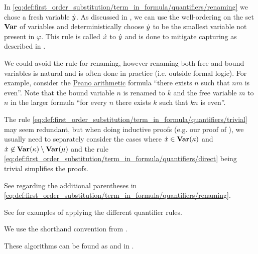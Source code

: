 \begin{comments}
  \item In \eqref{eq:def:first_order_substitution/term_in_formula/quantifiers/renaming} we chose a fresh variable \( {\dot{y}} \). As discussed in , we can use the well-ordering on the set \( \op*{Var} \) of variables and deterministically choose \( {\dot{y}} \) to be the smallest variable not present in \( \varphi \). This rule is called  \( {\dot{x}} \) to \( {\dot{y}} \) and is done to mitigate capturing as described in .

  \item We could avoid the rule for renaming, however renaming both free and bound variables is natural and is often done in practice (i.e. outside formal logic). For example, consider the \hyperref[def:peano_arithmetic]{Peano arithmetic} formula \enquote{there exists \( n \) such that \( nm \) is even}. Note that the bound variable \( n \) is renamed to \( k \) and the free variable \( m \) to \( n \) in the larger formula \enquote{for every \( n \) there exists \( k \) such that \( kn \) is even}.

  \item The rule \eqref{eq:def:first_order_substitution/term_in_formula/quantifiers/trivial} may seem redundant, but when doing inductive proofs (e.g. our proof of ), we usually need to separately consider the cases where \( \synx \in \op*{Var}(\kappa) \) and \( \synx \not\in \op*{Var}(\kappa) \setminus \op*{Var}(\mu) \) and the rule \eqref{eq:def:first_order_substitution/term_in_formula/quantifiers/direct} being trivial simplifies the proofs.

  \item See  regarding the additional parentheses in \eqref{eq:def:first_order_substitution/term_in_formula/quantifiers/renaming}.

  \item See  for examples of applying the different quantifier rules.

  \item We use the shorthand convention from .

  \item These algorithms can be found as  and  in \cite{code}.
\end{comments}

